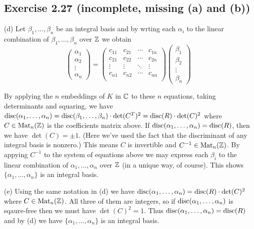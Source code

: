 \documentclass[../Marcus.tex]{subfiles}
\begin{document}
\subsection*{Exercise 2.27 \color{red}(incomplete, missing (a) and (b))}

(d) Let $\beta_1,\ldots,\beta_n$ be an integral basis and by wrting each $\alpha_i$ to the linear combination of $\beta_1,\ldots,\beta_n$ over $\mathbb{Z}$ we obtain
$$
\begin{pmatrix}
    \alpha_1  \\
    \alpha_2 \\
    \vdots \\
    \alpha_n
\end{pmatrix}
=
\begin{pmatrix}
    c_{11}  & c_{21} & \cdots & c_{1n} \\
    c_{21} & c_{22} & \cdots & c_{2n} \\
    \vdots & \vdots  & \ddots & \vdots \\
    c_{n1} & c_{n2} & \cdots & c_{nn} \\
\end{pmatrix}
\begin{pmatrix}
    \beta_1 \\
    \beta_2 \\
    \vdots \\
    \beta_n
\end{pmatrix}
$$

By applying the $n$ embeddings of $K$ in $\mathbb{C}$ to these $n$ equations, taking determinants and squaring, we have $\operatorname{disc}(\alpha_1,\ldots,\alpha_n)=\operatorname{disc}(\beta_1,\ldots,\beta_n)\cdot \det(C^T)^2=\operatorname{disc}(R)\cdot \det(C)^2$ where $C\in\operatorname{Mat}_n(\mathbb{Z})$ is the coefficients matrix above. If $\operatorname{disc}(\alpha_1,\ldots,\alpha_n)=\operatorname{disc}(R)$, then we have $\det(C)=\pm 1$. (Here we've used the fact that the discriminant of any integral basis is nonzero.) This means $C$ is invertible and $C^{-1}\in\operatorname{Mat}_n(\mathbb{Z})$. By appying $C^{-1}$ to the system of equations above we may express each $\beta_i$ to the linear combination of $\alpha_1,\ldots,\alpha_n$ over $\mathbb{Z}$ (in a unique way, of course). This shows $\{\alpha_1,\ldots,\alpha_n\}$ is an integral basis.

(e) Using the same notation in (d) we have $\operatorname{disc}(\alpha_1,\ldots,\alpha_n)=\operatorname{disc}(R)\cdot \det(C)^2$ where $C\in\operatorname{Mat}_n(\mathbb{Z})$. All three of them are integers, so if $\operatorname{disc}(\alpha_1,\ldots,\alpha_n)$ is sqaure-free then we must have $\det(C)^2=1$. Thus $\operatorname{disc}(\alpha_1,\ldots,\alpha_n)=\operatorname{disc}(R)$ and by (d) we have $\{\alpha_1,\ldots,\alpha_n\}$ is an integral basis.
\end{document}
